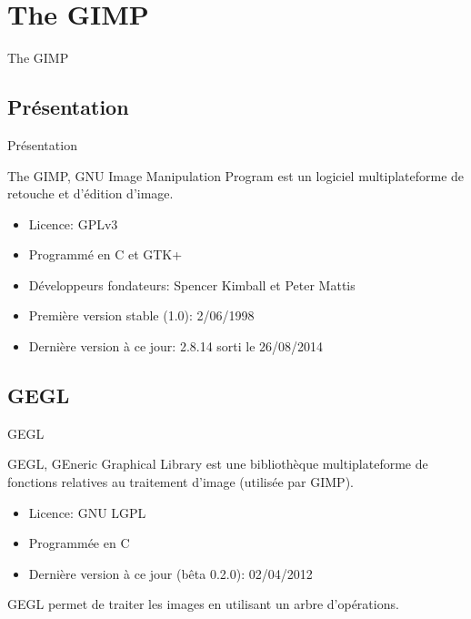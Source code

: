 \documentclass[french]{beamer}
\begin{document}
    \section{The GIMP}
        \begin{frame}{The GIMP}
        \end{frame}
        \subsection{Présentation}
            \begin{frame}{Présentation}
                \tableofcontents[sectionstyle=show/hide,subsectionstyle=show/shaded/hide]
            \end{frame}
            \begin{frame}
            The GIMP, GNU Image Manipulation Program est un logiciel multiplateforme de retouche et d'édition d'image.
                \begin{itemize}
                    \item Licence: GPLv3
                    \item Programmé en C et GTK+
                    \item Développeurs fondateurs: Spencer Kimball et Peter Mattis
                    \item Première version stable (1.0): 2/06/1998
                    \item Dernière version à ce jour: 2.8.14 sorti le 26/08/2014
                \end{itemize}
            \end{frame}
        \subsection{GEGL}
            \begin{frame}{GEGL}
                \tableofcontents[sectionstyle=show/hide,subsectionstyle=show/shaded/hide]
            \end{frame}
            \begin{frame}
                GEGL, GEneric Graphical Library est une bibliothèque multiplateforme de fonctions relatives au traitement d'image (utilisée par GIMP).\\
                 \begin{itemize}
                    \item Licence: GNU LGPL
                    \item Programmée en C
                    \item Dernière version à ce jour (bêta 0.2.0): 02/04/2012
                \end{itemize}
                GEGL permet de traiter les images en utilisant un arbre d'opérations.
            \end{frame}
\end{document}
